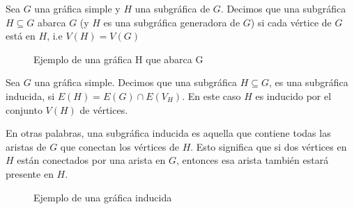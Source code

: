 \begin{definition}
    Sea $G$ una gráfica simple y $H$ una subgráfica de $G$. 
    Decimos que una subgráfica $H \subseteq G$ abarca $G$ (y $H$ es una subgráfica generadora de $G$) si cada vértice de $G$ está en $H$, i.e $V(H) = V(G)$\\
\end{definition}

\begin{example}
\begin{center}
\begin{figure}[h]
    \centering
    \caption{Ejemplo de una gráfica H que abarca G}
    \label{fig:GA}
\end{figure}
\end{center}

\end{example}


\begin{definition} 
    Sea $G$ una gráfica simple.
    Decimos que una subgráfica $H \subseteq G$, es una subgráfica inducida, si $E(H) = E(G) \cap E(V_H)$. En este caso $H$ es inducido por el conjunto $V(H)$ de vértices.
\end{definition}
\noindent En otras palabras, una subgráfica inducida es aquella que contiene todas las aristas de $G$ que conectan los vértices de $H$. Esto significa que si dos vértices en $H$ están conectados por una arista en $G$, entonces esa arista también estará presente en $H$.

\begin{example}
\begin{center}
\begin{figure}[h]
    \centering
    \caption{Ejemplo de una gráfica inducida}
    \label{fig:GI}
\end{figure}
\end{center}
\end{example}

